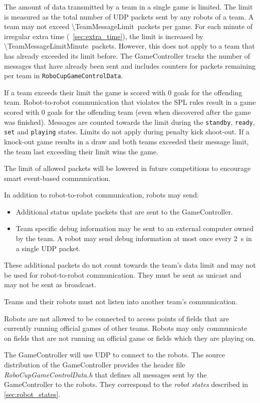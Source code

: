 The amount of data transmitted by a team in a single game is limited.
The limit is measured as the total number of UDP packets sent by any robots of a team.
A team may not exceed \qty{\TeamMessageLimit}{packets} per game.
For each minute of irregular extra time (\cf~\cref{sec:extra_time}), the limit is increased by \qty{\TeamMessageLimitMinute}{packets}.
However, this does not apply to a team that has already exceeded its limit before.
The GameController tracks the number of messages that have already been sent and includes counters for packets remaining per team in \texttt{RoboCupGameControlData}.

If a team exceeds their limit the game is scored with 0 goals for the offending team.
Robot-to-robot communication that violates the SPL rules result in a game scored with 0 goals for the offending team (even when discovered after the game was finished).
Messages are counted towards the limit during the \texttt{standby}, \texttt{ready}, \texttt{set} and \texttt{playing} states.
Limits do not apply during penalty kick shoot-out.
If a knock-out game results in a draw and both teams exceeded their message limit, the team last exceeding their limit wins the game.

The limit of allowed packets will be lowered in future competitions to encourage smart event-based communication.

In addition to robot-to-robot communication, robots may send:
\begin{itemize}
 \item Additional status update packets that are sent to the GameController.
 \item Team specific debug information may be sent to an external computer owned by the team.
   A robot may send debug information at most once every \qty{2}{\second} in a single UDP packet.
\end{itemize}
These additional packets do not count towards the team's data limit and may not be used for robot-to-robot communication.
They must be sent as unicast and may not be sent as broadcast.

Teams and their robots must not listen into another team's communication.

Robots are not allowed to be connected to access points of fields that are currently running official games of other teams.
Robots may only communicate on fields that are not running an official game or fields which they are playing on.

The GameController will use UDP to connect to the robots.
The source distribution of the GameController provides the header file \emph{RoboCupGameControlData.h} that defines all messages sent by the GameController to the robots.
They correspond to the \emph{robot states} described in \cref{sec:robot_states}.

